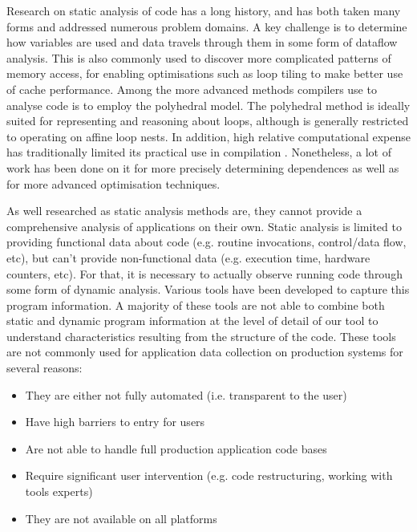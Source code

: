 Research on static analysis of code has a long history, and has both taken many forms and addressed numerous problem domains\cite{Andrade:2012:SAW:2355585.2355593}\cite{1194988}.
A key challenge is to determine how variables are used and data travels through them in some form of dataflow analysis\cite{Feautrier1991}.
This is also commonly used to discover more complicated patterns of memory access, for enabling optimisations such as loop tiling to make better use of cache performance.
Among the more advanced methods compilers use to analyse code is to employ the polyhedral model\cite{Cousot:1978:ADL:512760.512770}\cite{Bagnara:2009:APC:1628316.1628385}\cite{benabderrahmane.10.cc}.
The polyhedral method is ideally suited for representing and reasoning about loops, although is generally restricted to operating on affine loop nests. 
In addition, high relative computational expense has traditionally limited its practical use in compilation \cite{DBLP:journals/entcs/Simon10a}.
Nonetheless, a lot of work has been done on it for more precisely determining dependences \cite{Vasilache:2006:VDA:1183401.1183448} as well as for more advanced optimisation techniques\cite{Nieuwenhuizen2014AutovectorizationUP}\cite{5260526}.

As well researched as static analysis methods are, they cannot provide a comprehensive analysis of applications on their own.
Static analysis is limited to providing functional data about code (e.g. routine invocations, control/data flow, etc), but can't provide non-functional data (e.g. execution time, hardware counters, etc).
For that, it is necessary to actually observe running code through some form of dynamic analysis.
Various tools have been developed to capture this program information.
A majority of these tools are not able to combine both static and dynamic program information at the level of detail of our tool to understand characteristics resulting from the structure of the code.
These tools are not commonly used for application data collection on production systems for several reasons:
\begin{itemize}
\item They are either not fully automated (i.e. transparent to the user)
\item Have high barriers to entry for users
\item Are not able to handle full production application code bases
\item Require significant user intervention (e.g. code restructuring, working with tools experts)
\item They are not available on all platforms
\end{itemize}

